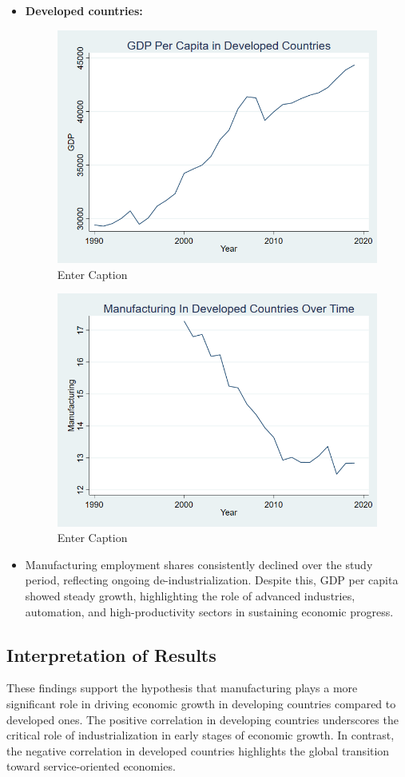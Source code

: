\documentclass[12pt]{article}
\begin{document}
\begin{itemize}
\item \textbf{Developed countries:} 
\begin{figure}
    \centering
    \includegraphics[width=0.5\linewidth]{FINAL FINAL GDP DEVELOPED.png}
    \caption{Enter Caption}
    \label{fig:enter-label}
\end{figure}
\begin{figure}
    \centering
    \includegraphics[width=0.5\linewidth]{FINAL FINAL MANU DEVELOPED.png}
    \caption{Enter Caption}
    \label{fig:enter-label}
\end{figure}

\item Manufacturing employment shares consistently declined over the study period, reflecting ongoing de-industrialization. Despite this, GDP per capita showed steady growth, highlighting the role of advanced industries, automation, and high-productivity sectors in sustaining economic progress.
\end{itemize}

\subsection{Interpretation of Results}

These findings support the hypothesis that manufacturing plays a more significant role in driving economic growth in developing countries compared to developed ones. The positive correlation in developing countries underscores the critical role of industrialization in early stages of economic growth. In contrast, the negative correlation in developed countries highlights the global transition toward service-oriented economies.
\end{document}
